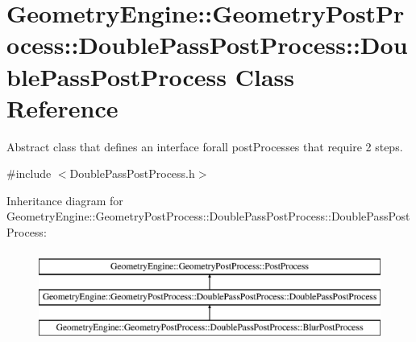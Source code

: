 \hypertarget{class_geometry_engine_1_1_geometry_post_process_1_1_double_pass_post_process_1_1_double_pass_post_process}{}\section{Geometry\+Engine\+::Geometry\+Post\+Process\+::Double\+Pass\+Post\+Process\+::Double\+Pass\+Post\+Process Class Reference}
\label{class_geometry_engine_1_1_geometry_post_process_1_1_double_pass_post_process_1_1_double_pass_post_process}


Abstract class that defines an interface forall post\+Processes that require 2 steps.  




{\ttfamily \#include $<$Double\+Pass\+Post\+Process.\+h$>$}

Inheritance diagram for Geometry\+Engine\+::Geometry\+Post\+Process\+::Double\+Pass\+Post\+Process\+::Double\+Pass\+Post\+Process\+:\begin{figure}[H]
\begin{center}
\leavevmode
\includegraphics[height=3.000000cm]{class_geometry_engine_1_1_geometry_post_process_1_1_double_pass_post_process_1_1_double_pass_post_process}
\end{center}
\end{figure}
